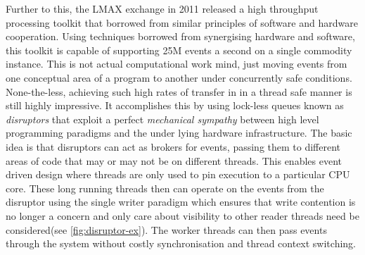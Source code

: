 \documentclass[a4paper,11pt]{scrreprt}
\begin{document}
Further to this, the LMAX exchange in 2011 released a high throughput processing toolkit that borrowed from similar principles of software and hardware cooperation. Using techniques borrowed from synergising hardware and software, this toolkit is capable of supporting 25M events a second on a single commodity instance\cite{disruptor-paper}. This is not actual computational work mind, just moving events from one conceptual area of a program to another under concurrently safe conditions. None-the-less, achieving such high rates of transfer in in a thread safe manner is still highly impressive. It accomplishes this by using lock-less queues known as \textit{disruptors} that exploit a perfect \textit{mechanical sympathy} between high level programming paradigms and the under lying hardware infrastructure. The basic idea is that disruptors can act as brokers for events, passing them to different areas of code that may or may not be on different threads. This enables event driven design where threads are only used to pin execution to a particular CPU core\cite{processor-affinity}. These long running threads then can operate on the events from the disruptor using the single writer paradigm which ensures that write contention is no longer a concern and only care about visibility to other reader threads need be considered(see \ref{fig:disruptor-ex}). The worker threads can then pass events through the system without costly synchronisation and thread context switching.
\end{document}
